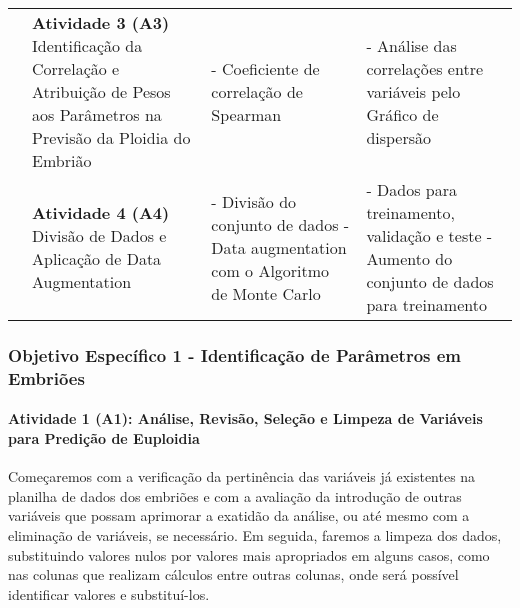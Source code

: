 \begin{table}[h!]
{\begin{tabular}{|p{3cm}|p{4cm}|p{3cm}|p{5cm}|}
      \cline{2-4}

      \cellcolor[HTML]{133e78} & 
      \textcolor[HTML]{133E78}{\textbf{Atividade 3 (A3)}} \newline
      Identificação da Correlação e Atribuição de Pesos aos Parâmetros na Previsão da Ploidia do Embrião &
      - Coeficiente de correlação de Spearman &
      - Análise das correlações entre variáveis pelo Gráfico de dispersão \\

      \cline{2-4}

      \cellcolor[HTML]{133e78} & 
      \vspace{0.2cm} \textcolor[HTML]{133E78}{\textbf{Atividade 4 (A4)}} \newline
      Divisão de Dados e Aplicação de Data Augmentation \vspace{0.2cm} & 
      - Divisão do conjunto de dados \newline
      - Data augmentation com o Algoritmo de Monte Carlo &
      - Dados para treinamento, validação e teste \newline
      - Aumento do conjunto de dados para treinamento \\

      \hline
    \end{tabular}
  }
\end{table} 
\FloatBarrier  %

\subsubsection{\textbf{Objetivo Específico 1} - Identificação de Parâmetros em Embriões}

\paragraph{\textbf{Atividade 1 (A1):} Análise, Revisão, Seleção e Limpeza de Variáveis para Predição de Euploidia}

Começaremos com a verificação da pertinência das variáveis já existentes na planilha de dados dos embriões e com a avaliação da introdução de outras variáveis que possam aprimorar a exatidão da análise, ou até mesmo com a eliminação de variáveis, se necessário. Em seguida, faremos a limpeza dos dados, substituindo valores nulos por valores mais apropriados em alguns casos, como nas colunas que realizam cálculos entre outras colunas, onde será possível identificar valores e substituí-los.

